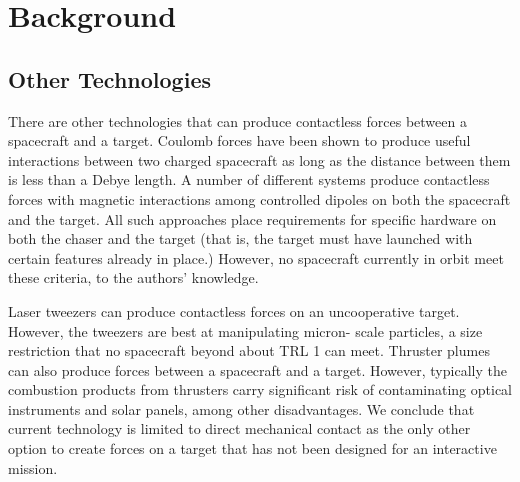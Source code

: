 %
%
\section{Background}
\subsection{Other Technologies}

There are other technologies that can produce
contactless forces between a spacecraft and a target.
Coulomb forces have been shown to produce useful
interactions between two charged spacecraft as long as
the distance between them is less than a Debye length. \cite{coulombtether}
A number of different systems produce contactless
forces with magnetic interactions among controlled
dipoles on both the spacecraft and the target.
\cite{dipoleplanning}
 All such approaches place requirements for specific hardware on both the chaser and the target (that is, the target must have launched with certain features already in place.) However, no spacecraft currently in orbit meet these criteria, to the
authors' ‎knowledge.

Laser tweezers can produce contactless forces on an 
uncooperative target. \cite{lasertweezers}  
However, the tweezers are best at manipulating micron- scale particles, a size restriction that no spacecraft beyond about TRL 1‎ can meet. \cite{lasermirrors} Thruster plumes can also produce forces between a spacecraft and a target. However, typically the combustion products from thrusters carry significant risk of contaminating optical instruments and solar panels, among other disadvantages. We conclude that current technology is limited to direct mechanical contact as the only other option to create forces on a target that has not been designed for an interactive mission.
%
%
%
